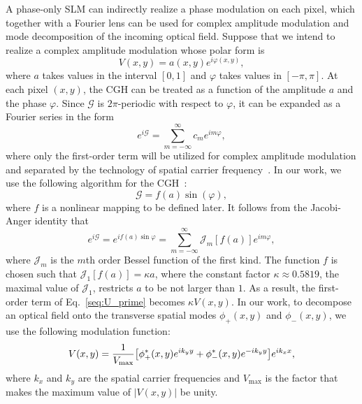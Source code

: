 \documentclass[aps,pra,10pt,showpacs,amsmath,amssymb,floatfix,superscriptaddress,twocolumn]{revtex4-2}
\begin{document}
A phase-only SLM can indirectly realize a phase modulation on each pixel, which together with a Fourier lens can be used for complex amplitude modulation and mode decomposition of the incoming optical field.
Suppose that we intend to realize a complex amplitude modulation whose polar form is
\begin{equation} \label{seq:V_polar_form}
    V(x,y)= a(x,y) e^{i\varphi(x,y)},
\end{equation}
where \(a\) takes values in the interval \([0,1]\) and \(\varphi\) takes values in \([-\pi, \pi]\).
At each pixel \((x,y)\), the CGH can be treated as a function of the amplitude \(a\) and the phase \(\varphi\).
Since \(\mathcal G\) is \(2\pi\)-periodic with respect to \(\varphi\), it can be expanded as a Fourier series in the form
\begin{equation} \label{seq:Fourier_series}
    e^{i\mathcal{G}} = \sum_{m=-\infty}^{\infty} c_m e^{im\varphi},
\end{equation}
where only the first-order term will be utilized for complex amplitude modulation and separated by the technology of spatial carrier frequency~\cite{supp_RosalesGuzman2017}.
In our work, we use the following algorithm for the CGH~\cite{supp_Arrizon2007}:
\begin{equation}
    \mathcal{G}=f(a) \sin(\varphi),
\end{equation}
where $f$ is a nonlinear mapping to be defined later.
It follows from the Jacobi-Anger identity that
\begin{equation}\label{seq:U_prime}
    e^{i \mathcal G} = e^{if(a)\sin\varphi}
    = \sum_{m=-\infty}^{\infty} \mathcal{J}_m[f(a)]e^{im\varphi},
\end{equation}
where $\mathcal{J}_m$ is the $m$th order Bessel function of the first kind.
The function \(f\) is chosen such that $\mathcal{J}_1[f(a)]=\kappa a$, where the constant factor $\kappa \approx 0.5819$, the maximal value of \(\mathcal{J}_1\), restricts \(a\) to be not larger than \(1\).
As a result, the first-order term of Eq.~\eqref{seq:U_prime} becomes $\kappa V(x,y)$.
In our work, to decompose an optical field onto the transverse spatial modes $\phi_+(x,y)$ and $\phi_-(x,y)$, we use the following modulation function:
\begin{equation} \label{seq:V_concrete}
    V(x, y) = \frac1{V_\mathrm{max}} \qty[\phi_+^*(x, y) e^{i k_y y} + \phi_-^*(x, y) e^{- i k_y y}] e^{i k_x x},
\end{equation}
where $k_x$ and $k_y$ are the spatial carrier frequencies and \(V_\mathrm{max}\) is the factor that makes the maximum value of \(|V(x,y)|\) be unity.
\end{document}
